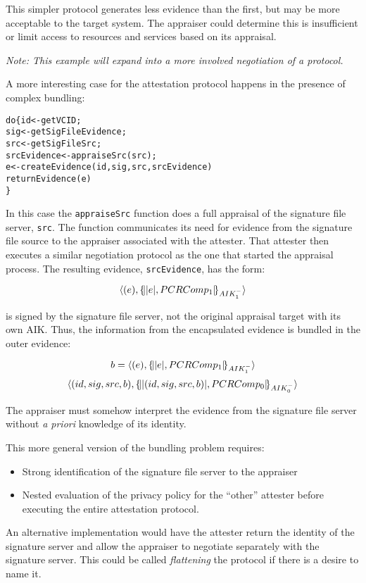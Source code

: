 \documentclass[10pt]{article}
\begin{document}
This simpler protocol generates less evidence than the first, but may
be more acceptable to the target system.  The appraiser could
determine this is insufficient or limit access to resources and
services based on its appraisal.

\emph{Note: This example will expand into a more involved negotiation
  of a protocol.}

A more interesting case for the attestation protocol happens in the
presence of complex bundling:

\begin{alltt}
  do \{ id <- getVCID;
       sig <- getSigFileEvidence;
       src <- getSigFileSrc;
       srcEvidence <- appraiseSrc(src);
       e <- createEvidence(id,sig,src,srcEvidence)
       returnEvidence(e)
  \}
\end{alltt}

In this case the \Verb+appraiseSrc+ function does a full appraisal of
the signature file server, \Verb+src+. The function communicates its
need for evidence from the signature file source to the appraiser
associated with the attester.  That attester
then executes a similar negotiation protocol as the one that started
the appraisal process.  The resulting evidence, \Verb+srcEvidence+,
has the form:

\[\langle (e),\{\!\lvert \lvert e \rvert,PCRComp_1\rvert\!\}_{AIK_1^{-}}\rangle\]

is signed by the signature file server, not the original appraisal
target with its own AIK. Thus, the information from the encapsulated
evidence is bundled in the outer evidence:

\[b=\langle (e),\{\!\lvert \lvert e \rvert,PCRComp_1\rvert\!\}_{AIK_1^{-}}\rangle\]
\[\langle (id,sig,src,b),\{\!\lvert \lvert (id,sig,src,b) \rvert,PCRComp_0\rvert\!\}_{AIK_0^{-}}\rangle\]

The appraiser must somehow interpret the evidence from the signature
file server without \emph{a priori} knowledge of its identity.

This more general version of the bundling problem requires:

\begin{itemize}
  \parskip=0pt\itemsep=0pt
\item Strong identification of the signature file server to the appraiser
\item Nested evaluation of the privacy policy for the ``other''
  attester before executing the entire attestation
  protocol.
\end{itemize}

An alternative implementation would have the attester
return the identity of the signature server and allow the appraiser to
negotiate separately with the signature server.  This could be called
\emph{flattening} the protocol if there is a desire to name it.
\end{document}
